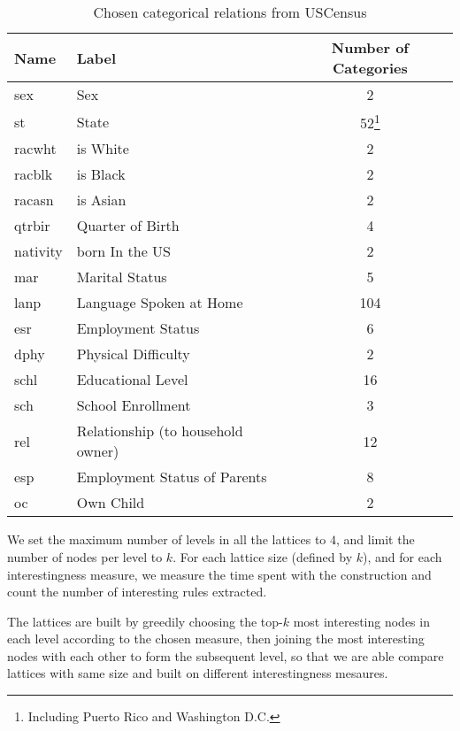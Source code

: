 \begin{table}[h!]
\begin{minipage}{\textwidth}
 \begin{center}
 \caption{Chosen categorical relations from USCensus}
  \begin{tabular}{l l c}
    \toprule
      Name	& Label				& Number of Categories \\
    \midrule
      sex	& Sex				&	2	\\
      st	& State				&	52\footnote{Including Puerto Rico and Washington D.C.}	\\
      racwht	& is White			&	2	\\
      racblk	& is Black			&	2	\\
      racasn	& is Asian			&	2	\\
      qtrbir	& Quarter of Birth		&	4	\\	
      nativity	& born In the US		&	2	\\
      mar	& Marital Status		&	5	\\
      lanp	& Language Spoken at Home	&	104	\\
      esr	& Employment Status		&	6	\\
      dphy	& Physical Difficulty		&	2	\\
      schl	& Educational Level		&	16	\\	
      sch	& School Enrollment		&	3	\\
      rel	& Relationship (to household owner)		&	12	\\
      esp	& Employment Status of Parents	&	8	\\
      oc	& Own Child			&	2	\\
    \bottomrule
  \end{tabular}
 \label{tab:uscensusRelations}
 \end{center}
\end{minipage}
\end{table}

We set the maximum number of levels in all the lattices to $4$, and limit the number of nodes per level to $k$. For
each lattice size (defined by $k$), and for each interestingness measure, we measure the time spent with the
construction and count the number of interesting rules extracted.

The lattices are built by greedily choosing the top-$k$ most interesting nodes in each level according to the chosen
measure, then joining the most interesting nodes with each other to form the subsequent level, so that we are able
compare lattices with same size and built on different interestingness mesaures.


